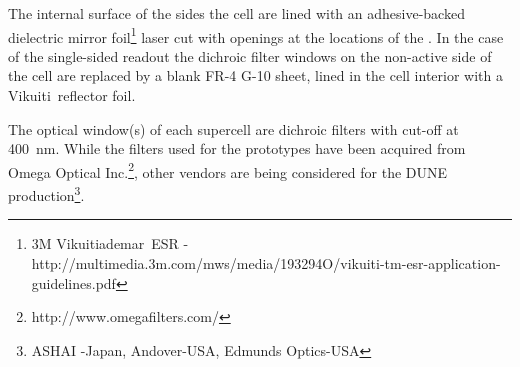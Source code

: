 


The  internal surface of the sides the cell are lined with an adhesive-backed dielectric mirror foil\footnote{3M Vikuitiademar\texttrademark\  ESR - http://multimedia.3m.com/mws/media/193294O/vikuiti-tm-esr-application-guidelines.pdf} laser cut with openings at the locations of the .  In the case of the single-sided readout the dichroic filter windows on the non-active side of the cell are replaced by a blank FR-4 G-10 sheet, lined in the cell interior with a Vikuiti\texttrademark\ reflector foil. %


The optical window(s) of each supercell are dichroic filters with cut-off at \SI{400}{nm}. While the filters used for the  prototypes have been acquired from Omega Optical Inc.\footnote{http://www.omegafilters.com/}, other vendors are being considered for the DUNE production\footnote{ASHAI -Japan, Andover-USA, Edmunds Optics-USA}.
   
